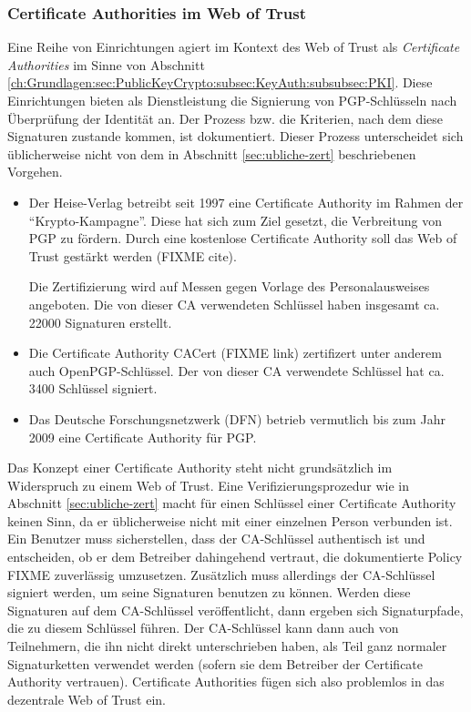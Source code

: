 \subsubsection{Certificate Authorities im Web of Trust}
\label{sec:cert-auth-im}

Eine Reihe von Einrichtungen agiert im Kontext des Web of Trust als
\emph{Certificate Authorities} im Sinne von Abschnitt
\ref{ch:Grundlagen:sec:PublicKeyCrypto:subsec:KeyAuth:subsubsec:PKI}. Diese
Einrichtungen bieten als Dienstleistung die Signierung von
PGP-Schl\"usseln nach \"Uberpr\"ufung der Identit\"at an. Der Prozess
bzw. die Kriterien, nach dem diese Signaturen zustande kommen, ist
dokumentiert. Dieser Prozess unterscheidet sich \"ublicherweise nicht
von dem in Abschnitt \ref{sec:ubliche-zert} beschriebenen Vorgehen.

\begin{itemize}
\item Der Heise-Verlag betreibt seit 1997 eine Certificate Authority
  im Rahmen der ``Krypto-Kampagne''. Diese hat sich zum Ziel gesetzt,
  die Verbreitung von PGP zu f\"ordern. Durch eine kostenlose
  Certificate Authority soll das Web of Trust gest\"arkt werden (FIXME
  cite).

  Die Zertifizierung wird auf Messen gegen Vorlage des
  Personalausweises angeboten. Die von dieser CA verwendeten
  Schl\"ussel haben insgesamt ca. 22000 Signaturen erstellt.
\item Die Certificate Authority CACert (FIXME link) zertifizert unter
  anderem auch OpenPGP-Schl\"ussel. Der von dieser CA verwendete
  Schl\"ussel hat ca. 3400 Schl\"ussel signiert.
\item Das Deutsche Forschungsnetzwerk (DFN) betrieb vermutlich bis zum
  Jahr 2009 eine Certificate Authority f\"ur PGP.
\end{itemize}

Das Konzept einer Certificate Authority steht nicht grunds\"atzlich im
Widerspruch zu einem Web of Trust. Eine Verifizierungsprozedur wie in
Abschnitt \ref{sec:ubliche-zert} macht f\"ur einen Schl\"ussel einer
Certificate Authority keinen Sinn, da er \"ublicherweise nicht mit
einer einzelnen Person verbunden ist. Ein Benutzer muss sicherstellen,
dass der CA-Schl\"ussel authentisch ist und entscheiden, ob er dem
Betreiber dahingehend vertraut, die dokumentierte Policy FIXME
zuverl\"assig umzusetzen. Zus\"atzlich muss allerdings der
CA-Schl\"ussel signiert werden, um seine Signaturen benutzen zu
k\"onnen. Werden diese Signaturen auf dem CA-Schl\"ussel
ver\"offentlicht, dann ergeben sich Signaturpfade, die zu diesem
Schl\"ussel f\"uhren. Der CA-Schl\"ussel kann dann auch von
Teilnehmern, die ihn nicht direkt unterschrieben haben, als Teil ganz
normaler Signaturketten verwendet werden (sofern sie dem Betreiber der
Certificate Authority vertrauen). Certificate Authorities f\"ugen sich
also problemlos in das dezentrale Web of Trust ein.

